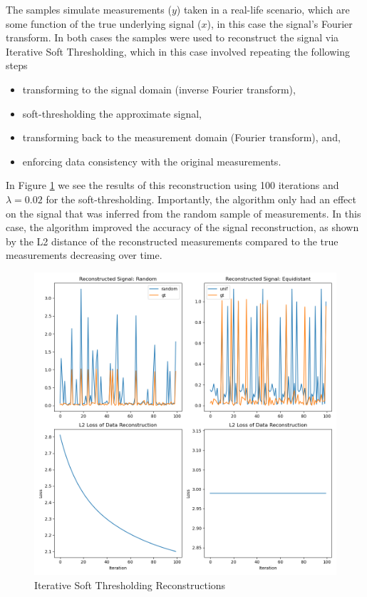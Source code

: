 \documentclass[12pt]{article}
\begin{document}
The samples simulate measurements ($y$) taken in a real-life scenario, which are some function of the true underlying signal ($x$),
in this case the signal's Fourier transform.
In both cases the samples were used to reconstruct the signal via Iterative Soft Thresholding,
which in this case involved repeating the following steps
\begin{itemize}
    \item transforming to the signal domain (inverse Fourier transform),
    \item soft-thresholding the approximate signal,
    \item transforming back to the measurement domain (Fourier transform), and,
    \item enforcing data consistency with the original measurements.
\end{itemize}

In Figure \ref{fig:signal_reconstruct} we see the results of this reconstruction using 100 iterations and $\lambda=0.02$ for the soft-thresholding.
Importantly, the algorithm only had an effect on the signal that was inferred from the random sample of measurements.
In this case, the algorithm improved the accuracy of the signal reconstruction,
as shown by the L2 distance of the reconstructed measurements compared to the true measurements decreasing over time.

\begin{figure}[htp]
    \includegraphics[scale=0.5, center]{figures/signal_reconstruct.png}
    \caption{Iterative Soft Thresholding Reconstructions}
    \label{fig:signal_reconstruct}
\end{figure}
\end{document}
